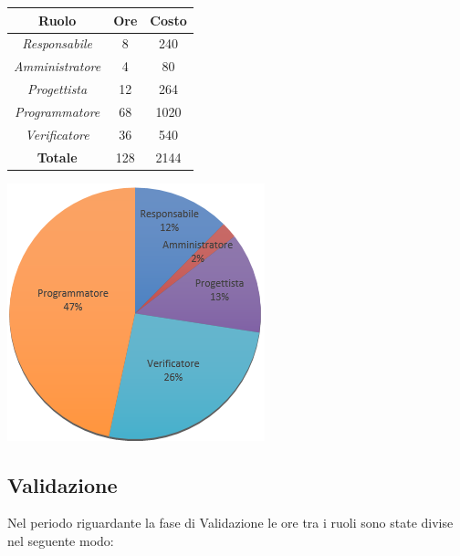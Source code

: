 \begin{center}
  \centering
  \begin{tabular}{|c|c|c|}
    \hline
    \textbf{Ruolo} & \textbf{Ore} & \textbf{Costo} \\
    \hline
     \emph{Responsabile}  & 8 & 240 \\
    \hline  \emph{Amministratore}  & 4 & 80 \\
    \hline  \emph{Progettista}  & 12 & 264 \\
    \hline  \emph{Programmatore}  & 68 & 1020 \\
    \hline  \emph{Verificatore}  & 36 & 540 \\
    \hline
    \textbf{Totale} & 128 & 2144 \\
    \hline
  \end{tabular}
  \includegraphics[scale=0.7]{img/5-Codifica.png}
\end{center}

\subsection{Validazione}
Nel periodo riguardante la fase di Validazione le ore tra i ruoli sono state divise nel seguente modo: \\ \\

